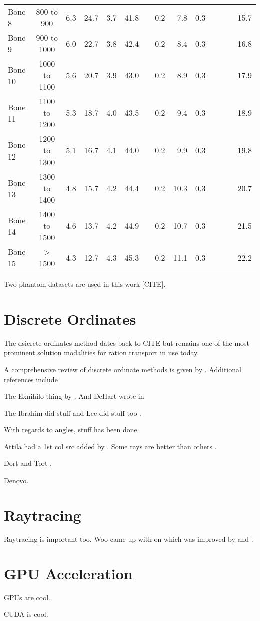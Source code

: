 \begin{table}[ht]
\begin{tabular}{l c r r r r r r r r r r r r}
Bone 8      & 800 to 900    &  6.3 & 24.7 &  3.7 & 41.8 &     & 0.2 &  7.8 & 0.3 &     &     &     & 15.7 \\ 
Bone 9      & 900 to 1000   &  6.0 & 22.7 &  3.8 & 42.4 &     & 0.2 &  8.4 & 0.3 &     &     &     & 16.8 \\ 
Bone 10     & 1000 to 1100  &  5.6 & 20.7 &  3.9 & 43.0 &     & 0.2 &  8.9 & 0.3 &     &     &     & 17.9 \\ 
Bone 11     & 1100 to 1200  &  5.3 & 18.7 &  4.0 & 43.5 &     & 0.2 &  9.4 & 0.3 &     &     &     & 18.9 \\ 
Bone 12     & 1200 to 1300  &  5.1 & 16.7 &  4.1 & 44.0 &     & 0.2 &  9.9 & 0.3 &     &     &     & 19.8 \\
Bone 13     & 1300 to 1400  &  4.8 & 15.7 &  4.2 & 44.4 &     & 0.2 & 10.3 & 0.3 &     &     &     & 20.7 \\
Bone 14     & 1400 to 1500  &  4.6 & 13.7 &  4.2 & 44.9 &     & 0.2 & 10.7 & 0.3 &     &     &     & 21.5 \\  
Bone 15     & > 1500        &  4.3 & 12.7 &  4.3 & 45.3 &     & 0.2 & 11.1 & 0.3 &     &     &     & 22.2 \\[1ex]
\hline
\end{tabular}
\label{table:ctmap}
\end{table}

Two phantom datasets are used in this work [CITE].

\section{Discrete Ordinates}\label{sec:discordlit}
The dsicrete ordinates method dates back to CITE but remains one of the most prominent solution modalities for ration transport in use today.

A comprehensive review of discrete ordinate methods is given by \citet{ref:lewise}. Additional references include 


The Exnihilo thing by \citet{ref:evanst}. And DeHart wrote in \citep{ref:dehartm}

The Ibrahim did stuff \citep{ref:ibrahima} and Lee did stuff too \citep{ref:leeb}.

With regards to angles, stuff has been done \citep{ref:ahrensc}

Attila had a 1st col src added by \citep{ref:wareingt}. Some rays are better than others \citep{ref:mathewsk}.

Dort and Tort \citep{ref:rhoadesw}.

Denovo.

\section{Raytracing}

Raytracing is important too. Woo came up with on \citep{ref:wooa} which was improved by \citet{ref:liuy} and \citet{ref:hel}.

\section{GPU Acceleration}
GPUs are cool.

CUDA is cool.


\endinput
